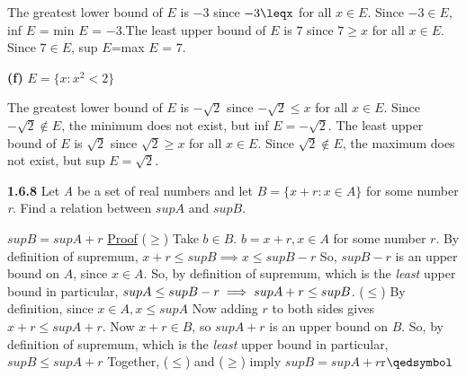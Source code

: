 \documentclass[12pt]{article}
\begin{document}
\begin{solution}\newline
The greatest lower bound of $E$ is $-3$ since $-3\leqx$ for all $x\in E$. Since $-3\in E$, inf $E$ = min $E$ = $-3$.\newline The least upper bound of $E$ is $7$ since $7\geq x$ for all $x\in E$. Since $7\in E$, sup $E$=max $E$ = $7$.
\end{solution}
\begin{subproblem}\textbf{(f)}
$E=\{x:x^2<2\}$
\end{subproblem}
\begin{solution}\newline
The greatest lower bound of $E$ is $-\sqrt{2}$ since $-\sqrt{2}\leq x$ for all $x\in E$. Since $-\sqrt{2}\notin E$, the minimum does not exist, but inf $E=-\sqrt{2}$.\newline
The least upper bound of $E$ is $\sqrt{2}$ since $\sqrt{2}\geq x$ for all $x\in E$. Since $\sqrt{2}\notin E$, the maximum does not exist, but sup $E=\sqrt{2}$.
\end{solution}
\begin{problem}\textbf{1.6.8}
Let \textit{A} be a set of real numbers and let $B=\{x+r:x\in A\}$ for some number \textit{r}. Find a relation between $sup A$ and $sup B$.
\end{problem}
\begin{solution}
$sup B=sup A+r$\newline
\underline{Proof}\newline
($\geq$) Take $b\in B$.\newline
$b=x+r, x\in A$ for some number $r$.\newline
By definition of supremum, $x+r\leq sup B\implies x\leq supB-r$\newline
So, $sup B-r$ is an upper bound on $A$, since $x\in A$.\newline
So, by definition of supremum, which is the \textit{least} upper bound in particular, $sup A\leq supB-r\newline
\implies supA+r\leq supB$.\newline
($\leq$) By definition, since $x\in A, x\leq sup A$\newline
Now adding $r$ to both sides gives $x+r\leq sup A+r$.\newline
Now $x+r\in B$, so $sup A+r$ is an upper bound on $B$.\newline
So, by definition of supremum, which is the \textit{least} upper bound in particular, $sup B\leq sup A+r$\newline
Together, ($\leq$) and ($\geq$) imply $sup B=sup A+r$\cdot r\flushright$\qedsymbol$
\end{solution}
\end{document}
